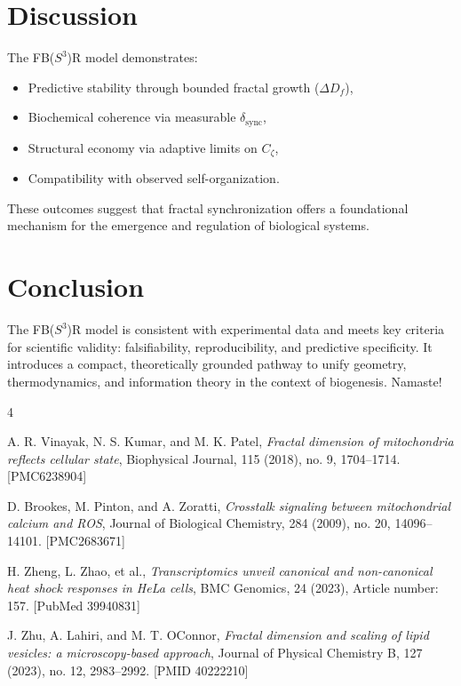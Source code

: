 \documentclass[12pt]{article}
\begin{document}
\section{Discussion}

The FB($S^3$)R model demonstrates:

\begin{itemize}
\item Predictive stability through bounded fractal growth ($\Delta D_f$),
\item Biochemical coherence via measurable $\delta_{\mathrm{sync}}$,
\item Structural economy via adaptive limits on $C_{\zeta}$,
\item Compatibility with observed self-organization.
\end{itemize}

These outcomes suggest that fractal synchronization offers a foundational mechanism for the emergence and regulation of biological systems.

\section{Conclusion}

The FB($S^3$)R model is consistent with experimental data and meets key criteria for scientific validity: falsifiability, reproducibility, and predictive specificity. It introduces a compact, theoretically grounded pathway to unify geometry, thermodynamics, and information theory in the context of biogenesis. Namaste!

\begin{thebibliography}{4}

A. R. Vinayak, N. S. Kumar, and M. K. Patel, \textit{Fractal dimension of mitochondria reflects cellular state}, Biophysical Journal, 115 (2018), no. 9, 1704--1714. [PMC6238904]

D. Brookes, M. Pinton, and A. Zoratti, \textit{Crosstalk signaling between mitochondrial calcium and ROS}, Journal of Biological Chemistry, 284 (2009), no. 20, 14096--14101. [PMC2683671]

H. Zheng, L. Zhao, et al., \textit{Transcriptomics unveil canonical and non-canonical heat shock responses in HeLa cells}, BMC Genomics, 24 (2023), Article number: 157. [PubMed 39940831]

J. Zhu, A. Lahiri, and M. T. OConnor, \textit{Fractal dimension and scaling of lipid vesicles: a microscopy-based approach}, Journal of Physical Chemistry B, 127 (2023), no. 12, 2983--2992. [PMID 40222210]

\end{thebibliography}
\end{document}
